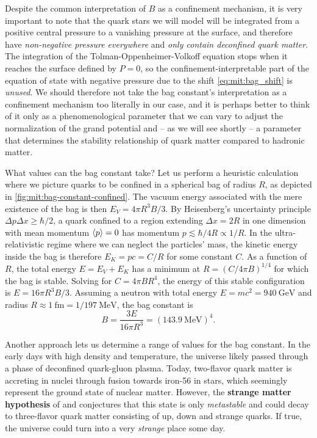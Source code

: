 Despite the common interpretation of $B$ as a confinement mechanism,
it is very important to note that the quark stars we will model 
will be integrated from a positive central pressure to a vanishing pressure at the surface,
and therefore have \emph{non-negative pressure everywhere} and \emph{only contain deconfined quark matter}.
The integration of the Tolman-Oppenheimer-Volkoff equation stops when it reaches the surface defined by $P=0$,
so the confinement-interpretable part of the equation of state with negative pressure due to the shift \eqref{eq:mit:bag_shift} is \emph{unused}.
We should therefore not take the bag constant's interpretation as a confinement mechanism too literally in our case,
and it is perhaps better to think of it only as a phenomenological parameter that we can vary to adjust the normalization of the grand potential
and -- as we will see shortly -- a parameter that determines the stability relationship of quark matter compared to hadronic matter.

What values can the bag constant take?
Let us perform a heuristic calculation where we picture quarks to be confined in a spherical bag of radius $R$, as depicted in \cref{fig:mit:bag-constant-confined}.
The vacuum energy associated with the mere existence of the bag is then $E_V = 4 \pi R^3 B / 3$.
By Heisenberg's uncertainty principle $\Delta p \Delta x \geq \hbar/2$, a quark confined to a region extending $\Delta x = 2R$ in one dimension with mean momentum $\langle p \rangle = 0$ has momentum $p \lesssim \hbar/4R \propto 1/R$.
In the ultra-relativistic regime where we can neglect the particles' mass, the kinetic energy inside the bag is therefore $E_K = pc = C / R$ for some constant $C$.
As a function of $R$, the total energy $E = E_V + E_K$ has a minimum at $R = (C/4 \pi B)^{1/4}$ for which the bag is stable.
Solving for $C = 4 \pi B R^4$, the energy of this stable configuration is $E = 16 \pi R^3 B / 3$.
Assuming a neutron with total energy $E = m c^2 = \SI{940}{\giga\electronvolt}$ and radius $R \approx \SI{1}{\femto\meter} = 1 / \SI{197}{\mega\electronvolt}$,
the bag constant is
\begin{equation}
	B = \frac{3 E}{16 \pi R^3} = (\SI{143.9}{\mega\electronvolt})^4.
\label{eq:mit:bag_constant_optimal}
\end{equation}

Another approach lets us determine a range of values for the bag constant.
In the early days with high density and temperature, the universe likely passed through a phase of deconfined quark-gluon plasma.
Today, two-flavor quark matter is accreting in nuclei through fusion towards iron-56 in stars, which seemingly represent the ground state of nuclear matter.
However, the \textbf{strange matter hypothesis} of \cite{ref:strange_hypothesis_bodmer} and \cite{ref:strange_hypothesis_witten} conjectures that this state is only \emph{metastable}
and could decay to three-flavor quark matter consisting of up, down and strange quarks.
If true, the universe could turn into a very \emph{strange} place some day.

